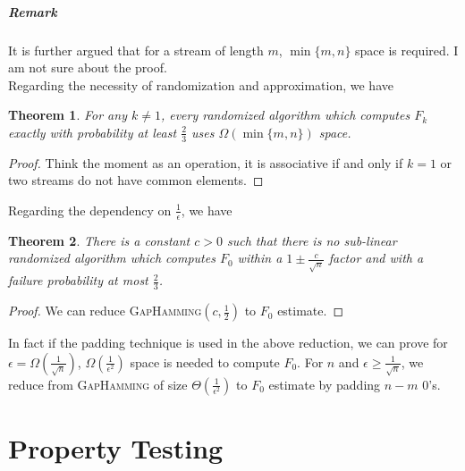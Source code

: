 \documentclass[openany]{book}
\newtheorem{theorem}{Theorem}[chapter]
\begin{document}
\paragraph{Remark}
It is further argued that for a stream of length $m$, $\min\{m,n\}$ space is required. I am not sure about the proof. \\

Regarding the necessity of randomization and approximation, we have
\begin{theorem}
    For any $k\ne1$, every randomized algorithm which computes $F_k$ exactly with probability at least $\frac{2}{3}$ uses $\Omega(\min\{m,n\})$ space.
\end{theorem}
\begin{proof}
    Think the moment as an operation, it is associative if and only if $k=1$ or two streams do not have common elements.
\end{proof}

Regarding the dependency on $\frac{1}{\epsilon}$, we have
\begin{theorem}
    There is a constant $c>0$ such that there is no sub-linear randomized algorithm which computes $F_0$ within a $1\pm \frac{c}{\sqrt{n}}$ factor and with a failure probability at most $\frac{2}{3}$.
\end{theorem}
\begin{proof}
    We can reduce \textsc{GapHamming}$(c,\frac{1}{2})$ to $F_0$ estimate.
\end{proof}
In fact if the padding technique is used in the above reduction, we can prove for $\epsilon=\Omega(\frac{1}{\sqrt{n}})$, $\Omega(\frac{1}{\epsilon^2})$ space is needed to compute $F_0$. For $n$ and $\epsilon\ge \frac{1}{\sqrt{n}}$, we reduce from \textsc{GapHamming} of size $\Theta(\frac{1}{\epsilon^2})$ to $F_0$ estimate by padding $n-m$ $0$'s.

\chapter{Property Testing}




\end{document}
